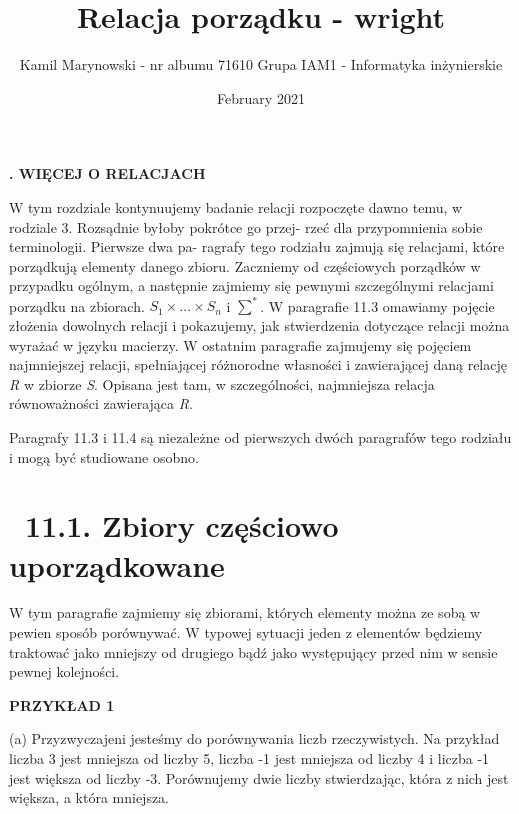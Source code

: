 \documentclass[14pt]{extarticle}
\title{Relacja porządku - wright}
\author{Kamil Marynowski - nr albumu 71610 Grupa IAM1 - Informatyka inżynierskie }
\date{February 2021}
\begin{document}
\thispagestyle{empty}


\textbf{
    {\fontsize{80}{10}.}
    \quad
    {\fontsize{20}{10}\selectfont WIĘCEJ O RELACJACH}    
}
\bigbreak
\bigbreak
\bigbreak
\bigbreak
\bigbreak
\bigbreak

\begin{changemargin}{160pt}{0pt} 
\qquad W tym rozdziale kontynuujemy badanie relacji rozpoczęte
dawno temu, w rodziale 3. Rozsądnie byłoby pokrótce go przej-
rzeć dla przypomnienia sobie terminologii. Pierwsze dwa pa-
ragrafy tego rodziału zajmują się relacjami, które porządkują
elementy danego zbioru. Zaczniemy od częściowych porządków
w przypadku ogólnym, a następnie zajmiemy się pewnymi 
szczególnymi relacjami porządku na zbiorach.
$S_{1} \times ... \times S_{n}$ i $\sum^{*}$. W paragrafie 11.3 omawiamy pojęcie złożenia dowolnych relacji i pokazujemy, jak stwierdzenia dotyczące relacji można wyrażać w języku macierzy. W ostatnim paragrafie zajmujemy się pojęciem najmniejszej relacji, spełniającej różnorodne własności i zawierającej daną relację \textit{R} w zbiorze \textit{S}. Opisana jest tam, w szczególności, najmniejsza relacja równoważności zawierająca \textit{R}.

\qquad Paragrafy 11.3 i 11.4 są niezależne od pierwszych dwóch paragrafów tego rodziału i mogą być studiowane osobno.
\end{changemargin} 


\section*{ \textsection~11.1. Zbiory częściowo uporządkowane}
\begin{changemargin}{160pt}{0pt} 
\qquad W tym paragrafie zajmiemy się zbiorami, których elementy
można ze sobą w pewien sposób porównywać. W typowej sytuacji jeden z elementów będziemy traktować jako mniejszy od drugiego bądź jako występujący przed nim w sensie pewnej kolejności.
\end{changemargin} 

\textbf{PRZYKŁAD 1} 
\begin{changemargin}{160pt}{0pt} 
\qquad (a) Przyzwyczajeni jesteśmy do porównywania liczb 
rzeczywistych.
Na przykład liczba 3 jest mniejsza od liczby 5, liczba -1 jest mniejsza od liczby 4 i liczba -1 jest większa od liczby -3. Porównujemy dwie liczby stwierdzając, która z nich jest większa, a która mniejsza.
\end{changemargin}
\end{document}
